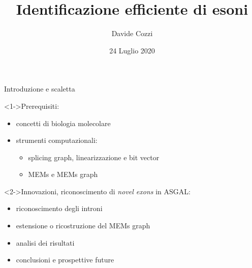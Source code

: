 \documentclass{beamer}
\author{Davide Cozzi}
\title{Identificazione efficiente di esoni}
\date{24 Luglio 2020}
\begin{document}
\titlepageframe

\begin{tframe}{Introduzione e scaletta}
  \begin{block}<1->{Prerequisiti:}
    \begin{itemize}
      \item concetti di biologia molecolare
      \item strumenti computazionali:
      \begin{itemize}
        \item splicing graph, linearizzazione e bit vector
        \item MEMs e MEMs graph
      \end{itemize}
    \end{itemize}
  \end{block}
  \begin{block}<2->{{Innovazioni, riconoscimento di \textit{novel
        exons} in ASGAL:}} 
    \begin{itemize}
      \item riconoscimento degli introni 
      \item estensione o ricostruzione del MEMs graph
      \item analisi dei risultati
      \item conclusioni e prospettive future
    \end{itemize}
  \end{block}
\end{tframe}
\end{document}
